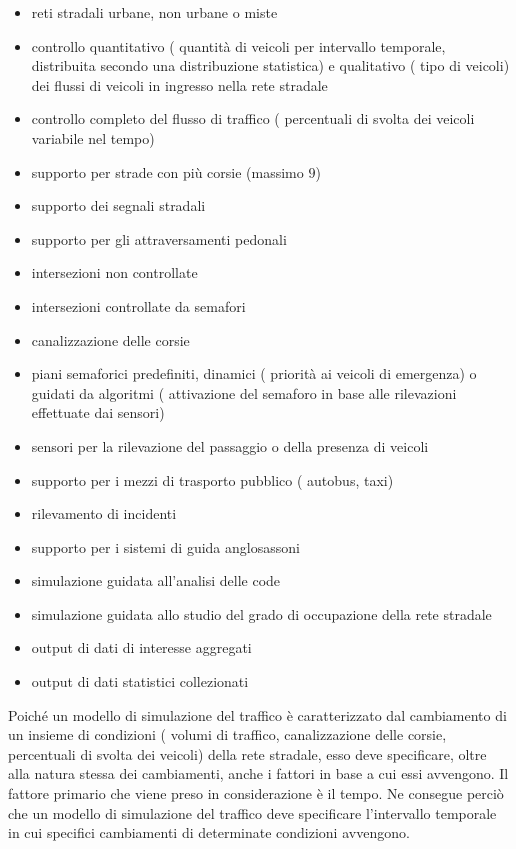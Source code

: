 \begin{itemize}
    \item reti stradali urbane, non urbane o miste
    \item controllo quantitativo (\ie{} quantità di veicoli per intervallo temporale, distribuita secondo una distribuzione statistica) e qualitativo (\ie{} tipo di veicoli) dei flussi di veicoli in ingresso nella rete stradale
    \item controllo completo del flusso di traffico (\ie{} percentuali di svolta dei veicoli variabile nel tempo)
    \item supporto per strade con più corsie (massimo $9$)
    \item supporto dei segnali stradali
    \item supporto per gli attraversamenti pedonali
    \item intersezioni non controllate
    \item intersezioni controllate da semafori
    \item canalizzazione delle corsie
    \item piani semaforici predefiniti, dinamici (\eg{} priorità ai veicoli di emergenza) o guidati da algoritmi (\eg{} attivazione del semaforo in base alle rilevazioni effettuate dai sensori)
    \item sensori per la rilevazione del passaggio o della presenza di veicoli
    \item supporto per i mezzi di trasporto pubblico (\ie{} autobus, taxi)
    \item rilevamento di incidenti
    \item supporto per i sistemi di guida anglosassoni
    \item simulazione guidata all'analisi delle code
    \item simulazione guidata allo studio del grado di occupazione della rete stradale
    \item output di dati di interesse aggregati
    \item output di dati statistici collezionati
\end{itemize}

Poiché un modello di simulazione del traffico è caratterizzato dal cambiamento di un insieme di condizioni (\eg{} volumi di traffico, canalizzazione delle corsie, percentuali di svolta dei veicoli) della rete stradale, esso deve specificare, oltre alla natura stessa dei cambiamenti, anche i fattori in base a cui essi avvengono. Il fattore primario che viene preso in considerazione è il tempo. Ne consegue perciò che un modello di simulazione del traffico deve specificare l'intervallo temporale in cui specifici cambiamenti di determinate condizioni avvengono.

